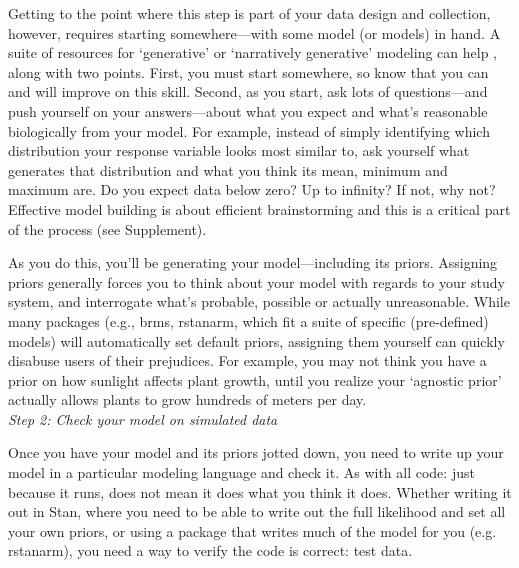 \documentclass[11pt]{article}
\begin{document}
Getting to the point where this step is part of your data design and collection, however, requires starting somewhere---with some model (or models) in hand. A suite of resources for `generative' or `narratively generative' modeling can help \citep{statrethink,betangen}, along with two points. First, you must start somewhere, so know that you can and will improve on this skill. Second, as you start, ask lots of questions---and push yourself on your answers---about what you expect and what's reasonable biologically from your model. For example, instead of simply identifying which distribution your response variable looks most similar to, ask yourself what generates that distribution and what you think its mean, minimum and maximum are. Do you expect data below zero? Up to infinity? If not, why not? Effective model building is about efficient brainstorming and this is a critical part of the process (see Supplement). 

As you do this, you'll be generating your model---including its priors. Assigning priors generally forces you to think about your model with regards to your study system, and interrogate what's probable, possible or actually unreasonable. While many packages (e.g., \textsf{brms, rstanarm}, which fit a suite of specific (pre-defined) models) will automatically set default priors, assigning them yourself can quickly disabuse users of their prejudices. For example, you may not think you have a prior on how sunlight affects plant growth, until you realize your `agnostic prior' actually allows plants to grow hundreds of meters per day. \\%

\emph{Step 2: Check your model on simulated data} 

Once you have your model and its priors jotted down, you need to write up your model in a particular modeling language and check it. As with all code: just because it runs, does not mean it does what you think it does. Whether writing it out in \textsf{Stan}, where you need to be able to write out the full likelihood and set all your own priors, or using a package that writes much of the model for you (e.g. \textsf{rstanarm}), you need a way to verify the code is correct: test data.
\end{document}
